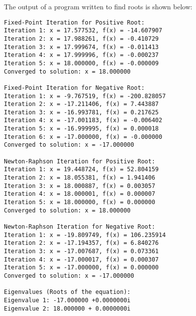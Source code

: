 \documentclass[journal]{IEEEtran}
\begin{document}
The output of a program written to find roots is shown below:
\begin{verbatim}
Fixed-Point Iteration for Positive Root:
Iteration 1: x = 17.577532, f(x) = -14.607907
Iteration 2: x = 17.988261, f(x) = -0.410729
Iteration 3: x = 17.999674, f(x) = -0.011413
Iteration 4: x = 17.999996, f(x) = -0.000237
Iteration 5: x = 18.000000, f(x) = -0.000009
Converged to solution: x = 18.000000

Fixed-Point Iteration for Negative Root:
Iteration 1: x = -9.767519, f(x) = -200.828057
Iteration 2: x = -17.211406, f(x) = 7.443887
Iteration 3: x = -16.993781, f(x) = 0.217625
Iteration 4: x = -17.001183, f(x) = -0.006402
Iteration 5: x = -16.999995, f(x) = 0.000018
Iteration 6: x = -17.000000, f(x) = -0.000000
Converged to solution: x = -17.000000

Newton-Raphson Iteration for Positive Root:
Iteration 1: x = 19.448724, f(x) = 52.804159
Iteration 2: x = 18.055381, f(x) = 1.941406
Iteration 3: x = 18.000887, f(x) = 0.003057
Iteration 4: x = 18.000001, f(x) = 0.000007
Iteration 5: x = 18.000000, f(x) = 0.000000
Converged to solution: x = 18.000000

Newton-Raphson Iteration for Negative Root:
Iteration 1: x = -19.809749, f(x) = 106.235914
Iteration 2: x = -17.194357, f(x) = 6.840276
Iteration 3: x = -17.007687, f(x) = 0.073361
Iteration 4: x = -17.000017, f(x) = 0.000307
Iteration 5: x = -17.000000, f(x) = 0.000000
Converged to solution: x = -17.000000

Eigenvalues (Roots of the equation):
Eigenvalue 1: -17.000000 +0.0000000i
Eigenvalue 2: 18.000000 + 0.0000000i
\end{verbatim}
\end{document}
